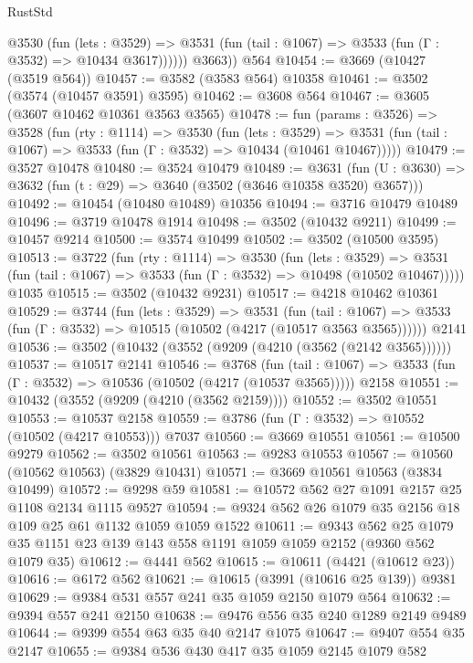 \begin{lexlean}{RustStd}
\begin{coremodule}
            @3530
              (fun (lets : @3529) =>
              @3531 (fun (tail : @1067) => @3533 (fun (Γ : @3532) => @10434 @3617))))))
        @3663))
    @564
@10454 := @3669 (@10427 (@3519 @564))
@10457 := @3582 (@3583 @564) @10358
@10461 := @3502 (@3574 (@10457 @3591) @3595)
@10462 := @3608 @564
@10467 := @3605 (@3607 @10462 @10361 @3563 @3565)
@10478 := fun (params : @3526) =>
  @3528
    (fun (rty : @1114) =>
    @3530
      (fun (lets : @3529) =>
      @3531 (fun (tail : @1067) => @3533 (fun (Γ : @3532) => @10434 (@10461 @10467)))))
@10479 := @3527 @10478
@10480 := @3524 @10479
@10489 := @3631
    (fun (U : @3630) => @3632 (fun (t : @29) => @3640 (@3502 (@3646 @10358 @3520) @3657)))
@10492 := @10454 (@10480 @10489) @10356
@10494 := @3716 @10479 @10489
@10496 := @3719 @10478 @1914
@10498 := @3502 (@10432 @9211)
@10499 := @10457 @9214
@10500 := @3574 @10499
@10502 := @3502 (@10500 @3595)
@10513 := @3722
    (fun (rty : @1114) =>
    @3530
      (fun (lets : @3529) =>
      @3531 (fun (tail : @1067) => @3533 (fun (Γ : @3532) => @10498 (@10502 @10467)))))
    @1035
@10515 := @3502 (@10432 @9231)
@10517 := @4218 @10462 @10361
@10529 := @3744
    (fun (lets : @3529) =>
    @3531
      (fun (tail : @1067) =>
      @3533 (fun (Γ : @3532) => @10515 (@10502 (@4217 (@10517 @3563 @3565))))))
    @2141
@10536 := @3502 (@10432 (@3552 (@9209 (@4210 (@3562 (@2142 @3565))))))
@10537 := @10517 @2141
@10546 := @3768
    (fun (tail : @1067) => @3533 (fun (Γ : @3532) => @10536 (@10502 (@4217 (@10537 @3565)))))
    @2158
@10551 := @10432 (@3552 (@9209 (@4210 (@3562 @2159))))
@10552 := @3502 @10551
@10553 := @10537 @2158
@10559 := @3786 (fun (Γ : @3532) => @10552 (@10502 (@4217 @10553))) @7037
@10560 := @3669 @10551
@10561 := @10500 @9279
@10562 := @3502 @10561
@10563 := @9283 @10553
@10567 := @10560 (@10562 @10563) (@3829 @10431)
@10571 := @3669 @10561 @10563 (@3834 @10499)
@10572 := @9298 @59
@10581 := @10572 @562 @27 @1091 @2157 @25 @1108 @2134 @1115 @9527
@10594 := @9324 @562 @26 @1079 @35 @2156 @18 @109 @25 @61 @1132 @1059 @1059 @1522
@10611 := @9343
    @562
    @25
    @1079
    @35
    @1151
    @23
    @139
    @143
    @558
    @1191
    @1059
    @1059
    @2152
    (@9360 @562 @1079 @35)
@10612 := @4441 @562
@10615 := @10611 (@4421 (@10612 @23))
@10616 := @6172 @562
@10621 := @10615 (@3991 (@10616 @25 @139)) @9381
@10629 := @9384 @531 @557 @241 @35 @1059 @2150 @1079 @564
@10632 := @9394 @557 @241 @2150
@10638 := @9476 @556 @35 @240 @1289 @2149 @9489
@10644 := @9399 @554 @63 @35 @40 @2147 @1075
@10647 := @9407 @554 @35 @2147
@10655 := @9384 @536 @430 @417 @35 @1059 @2145 @1079 @582

\end{coremodule}
\end{lexlean}
